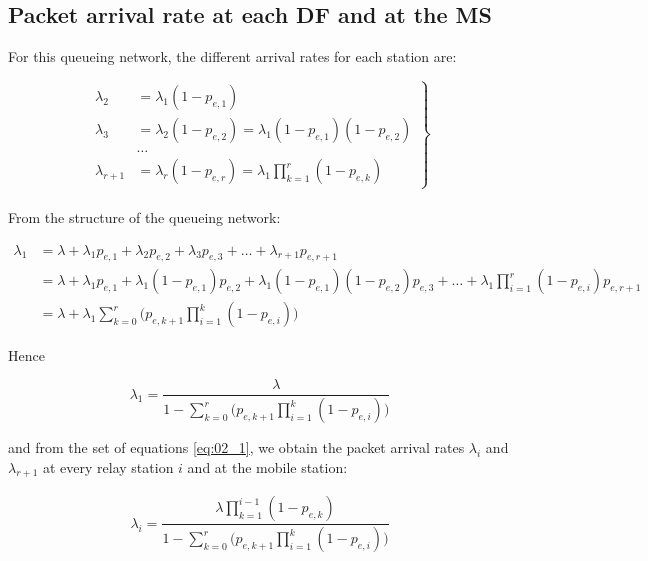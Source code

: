 \subsection{Packet arrival rate at each DF and at the MS}

For this queueing network, the different arrival rates for each station are:

\begin{equation}
 \left.
  \begin{array}{rl}
    \lambda_2 &= \lambda_1 (1 - p_{e,1}) \\
    \lambda_3 &= \lambda_2 (1 - p_{e,2}) = \lambda_1 (1 - p_{e,1}) (1 - p_{e,2}) \\
    & \dots \\
    \lambda_{r+1} &= \lambda_r (1-p_{e,r}) = \lambda_1 \prod\limits_{k=1}^{r} (1 - p_{e,k})
  \end{array}
\right\} \label{eq:02_1}
\end{equation} \\

From the structure of the queueing network:

\begin{align*}
  \lambda_1 &= \lambda + \lambda_1 p_{e,1} + \lambda_2 p_{e,2} + \lambda_3 p_{e,3}
  + \dots
  + \lambda_{r+1} p_{e,r+1} \\
  ~ &= \lambda + \lambda_1 p_{e,1} + \lambda_1 (1 - p_{e,1}) p_{e,2}
  + \lambda_1 (1 - p_{e,1})(1 - p_{e,2}) p_{e,3}
  + \dots
  + \lambda_1 \prod\limits_{i=1}^r (1 - p_{e,i}) p_{e,r+1} \\
  ~ &= \lambda + \lambda_1 \sum_{k=0}^r \Big(p_{e,k+1} \prod\limits_{i=1}^k (1 - p_{e,i})\Big)
\end{align*}

Hence

\begin{equation*}
  \lambda_1 = \dfrac{\lambda}{1 - \sum\limits_{k=0}^r \Big(p_{e,k+1} \prod\limits_{i=1}^k (1 - p_{e,i})\Big)}
\end{equation*}

and from the set of equations \ref{eq:02_1}, we obtain the packet arrival rates
$\lambda_i$ and $\lambda_{r+1}$ at every relay station $i$ and at the mobile
station:

\begin{align*}
  \lambda_i = \dfrac{\lambda \prod\limits_{k=1}^{i-1} (1 - p_{e,k})}{1 - \sum\limits_{k=0}^r \Big(p_{e,k+1} \prod\limits_{i=1}^k (1 - p_{e,i})\Big)}
\end{align*}

